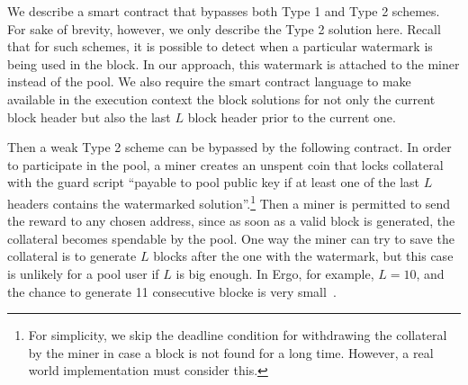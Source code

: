 \documentclass[11pt]{article}
\begin{document}
We describe a smart contract that bypasses both Type 1 and Type 2 schemes. For sake of brevity, however, we only describe the Type 2 solution here. Recall that for such schemes, it is possible to detect when a particular watermark is being used in the block. In our approach, this watermark is attached to the miner instead of the pool. 
We also require the smart contract language to make available in the execution context the block solutions for not only the current block header but also the last $L$ block header prior to the current one. 

Then a weak Type 2 scheme can be bypassed by the following contract. In order to participate in the pool, a miner creates an unspent coin that locks collateral with the guard script ``payable to pool public key if at least one of the last $L$ headers contains the watermarked solution''.\footnote{For simplicity, we skip the deadline condition for withdrawing the collateral by the miner in case a block is not found for a long time. However, a real world implementation must consider this.}
Then a miner is permitted to send the reward to any chosen address, since as soon as a valid block is generated, the collateral becomes spendable by the pool. One way the miner can try to save the collateral is to generate $L$ blocks after the one with the watermark, but this case is unlikely for a pool user if $L$ is big enough. In Ergo, for example, $L = 10$, and the chance to generate 11 consecutive blocke is very small~\cite{Nak08}. 




\end{document}

